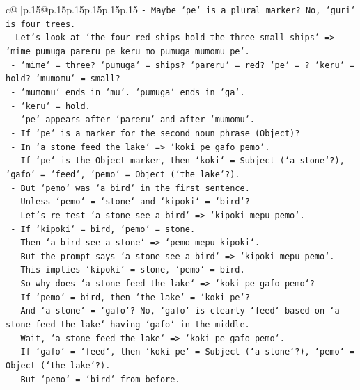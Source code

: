 \documentclass{article}
\begin{document}
{\begin{supertabular}{c@{$\;$}|p{.15\linewidth}@{}p{.15\linewidth}p{.15\linewidth}p{.15\linewidth}p{.15\linewidth}p{.15\linewidth}}
{{{\texttt{{-} Maybe `pe` is a plural marker? No, `guri` is four trees.} \\
\texttt{{-} Let's look at `the four red ships hold the three small ships` => `mime pumuga pareru pe keru mo pumuga mumomu pe`.} \\
\texttt{  {-} `mime` = three? `pumuga` = ships? `pareru` = red? `pe` = ? `keru` = hold? `mumomu` = small?} \\
\texttt{  {-} `mumomu` ends in `mu`. `pumuga` ends in `ga`.} \\
\texttt{  {-} `keru` = hold.} \\
\texttt{  {-} `pe` appears after `pareru` and after `mumomu`.} \\
\texttt{  {-} If `pe` is a marker for the second noun phrase (Object)?} \\
\texttt{  {-} In `a stone feed the lake` => `koki pe gafo pemo`.} \\
\texttt{    {-} If `pe` is the Object marker, then `koki` = Subject (`a stone`?), `gafo` = `feed`, `pemo` = Object (`the lake`?).} \\
\texttt{    {-} But `pemo` was `a bird` in the first sentence.} \\
\texttt{    {-} Unless `pemo` = `stone` and `kipoki` = `bird`?} \\
\texttt{    {-} Let's re{-}test `a stone see a bird` => `kipoki mepu pemo`.} \\
\texttt{      {-} If `kipoki` = bird, `pemo` = stone.} \\
\texttt{      {-} Then `a bird see a stone` => `pemo mepu kipoki`.} \\
\texttt{      {-} But the prompt says `a stone see a bird` => `kipoki mepu pemo`.} \\
\texttt{      {-} This implies `kipoki` = stone, `pemo` = bird.} \\
\texttt{      {-} So why does `a stone feed the lake` => `koki pe gafo pemo`?} \\
\texttt{      {-} If `pemo` = bird, then `the lake` = `koki pe`?} \\
\texttt{      {-} And `a stone` = `gafo`? No, `gafo` is clearly `feed` based on `a stone feed the lake` having `gafo` in the middle.} \\
\texttt{      {-} Wait, `a stone feed the lake` => `koki pe gafo pemo`.} \\
\texttt{      {-} If `gafo` = `feed`, then `koki pe` = Subject (`a stone`?), `pemo` = Object (`the lake`?).} \\
\texttt{      {-} But `pemo` = `bird` from before.} \\
}}}
\end{supertabular}}
\end{document}
